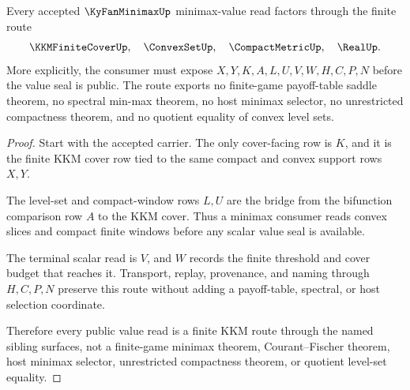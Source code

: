 \begin{theorem}
\label{thm:ky-fan-minimax-kkm-route}
Every accepted $\KyFanMinimaxUp$ minimax-value read factors through the finite route
$$
\KKMFiniteCoverUp,\quad \ConvexSetUp,\quad \CompactMetricUp,\quad \RealUp .
$$
More explicitly, the consumer must expose $X,Y,K,A,L,U,V,W,H,C,P,N$ before the value seal is public. The route exports no finite-game payoff-table saddle theorem, no spectral min-max theorem, no host minimax selector, no unrestricted compactness theorem, and no quotient equality of convex level sets.
\end{theorem}
\begin{proof}
Start with the accepted carrier. The only cover-facing row is $K$, and it is the finite KKM cover row tied to the same compact and convex support rows $X,Y$.

The level-set and compact-window rows $L,U$ are the bridge from the bifunction comparison row $A$ to the KKM cover. Thus a minimax consumer reads convex slices and compact finite windows before any scalar value seal is available.

The terminal scalar read is $V$, and $W$ records the finite threshold and cover budget that reaches it. Transport, replay, provenance, and naming through $H,C,P,N$ preserve this route without adding a payoff-table, spectral, or host selection coordinate.

Therefore every public value read is a finite KKM route through the named sibling surfaces, not a finite-game minimax theorem, Courant--Fischer theorem, host minimax selector, unrestricted compactness theorem, or quotient level-set equality.
\end{proof}


\begin{closurestatus}{\KyFanMinimaxUp}
  \theoryclosure{\seedClosure}
  \formalstatus{\unformalizedV}
\end{closurestatus}

